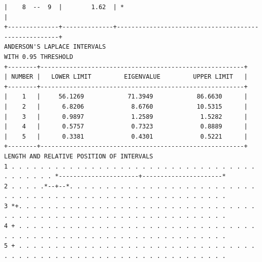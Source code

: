 \documentclass[a4paper,10pt,twocolumn]{article}
\begin{document}
\begin{landscape}
\begin{verbatim}
|    8  --  9  |        1.62  | *                                                    |
+--------------+--------------+------------------------------------------------------+
ANDERSON'S LAPLACE INTERVALS
WITH 0.95 THRESHOLD
+--------+--------------------------------------------------------+
| NUMBER |   LOWER LIMIT         EIGENVALUE         UPPER LIMIT   |
+--------+--------------------------------------------------------+
|    1   |     56.1269            71.3949            86.6630      |
|    2   |      6.8206             8.6760            10.5315      |
|    3   |      0.9897             1.2589             1.5282      |
|    4   |      0.5757             0.7323             0.8889      |
|    5   |      0.3381             0.4301             0.5221      |
+--------+--------------------------------------------------------+
LENGTH AND RELATIVE POSITION OF INTERVALS
1 . . . . . . . . . . . . . . . . . . . . . . . . . . . . . . . . . . . . . . . . . *----------------------+----------------------*
2 . . . . .*--+--*. . . . . . . . . . . . . . . . . . . . . . . . . . . . . . . . . . . . . . . . . . . . . . . . . . . . . . . . .
3 *+. . . . . . . . . . . . . . . . . . . . . . . . . . . . . . . . . . . . . . . . . . . . . . . . . . . . . . . . . . . . . . . .
4 + . . . . . . . . . . . . . . . . . . . . . . . . . . . . . . . . . . . . . . . . . . . . . . . . . . . . . . . . . . . . . . . .
5 + . . . . . . . . . . . . . . . . . . . . . . . . . . . . . . . . . . . . . . . . . . . . . . . . . . . . . . . . . . . . . . . .



\end{verbatim}
\end{landscape}
\end{document}
